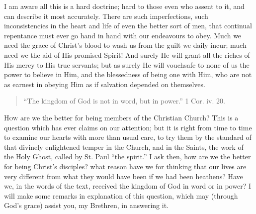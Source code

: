 I am aware all this is a hard doctrine; hard to those
even who assent to it, and can describe it most
accurately. There are such imperfections, such
inconsistencies in the heart and life of even the better
sort of men, that continual repentance must ever go hand
in hand with our endeavours to obey. Much we need the
grace of Christ's blood to wash us from the guilt we
daily incur; much need we the aid of His promised Spirit!
And surely He will grant all the riches of His mercy to
His true servants; but as surely He will vouchsafe to
none of us the power to believe in Him, and the
blessedness of being one with Him, who are not as earnest
in obeying Him as if salvation depended on themselves.


\begin{quote}

``The kingdom of God is not in word, but in
power.'' 1 Cor. iv. 20.

\end{quote}

H\textsc{ow} are we the better for being members of the
Christian Church? This is a question which has ever
claims on our attention; but it is right from time to
time to examine our hearts with more than usual care, to
try them by the standard of that divinely enlightened
temper in the Church, and in the Saints, the work of the
Holy Ghost, called by St. Paul ``the spirit.'' I
ask then, how are we the better for being Christ's
disciples? what reason have we for thinking that our
lives are very different from what they would have been
if we had been heathens? Have we, in the words of the
text, received the kingdom of God in word or in power? I
will make some remarks in explanation of this question,
which may (through God's grace) assist you, my Brethren,
in answering it.

